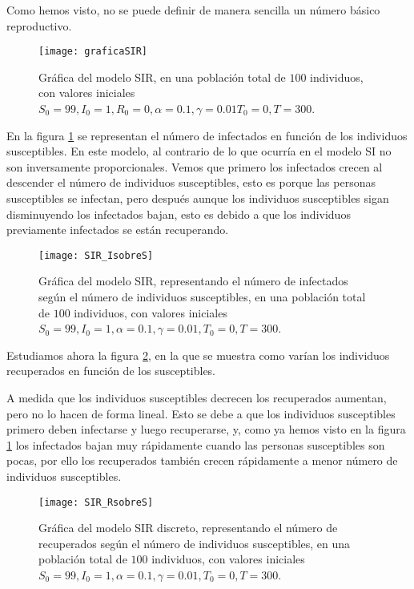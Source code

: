 Como hemos visto, no se puede definir de manera sencilla un número básico reproductivo.

\begin{figure}
\begin{center}
\caption{Gráfica del modelo SIR, en una población total de $100$ individuos, con valores iniciales $S_0=99, I_0 = 1, R_0 = 0, \alpha = 0.1, \gamma = 0.01 T_0 = 0, T = 300$.}
\texttt{[image: graficaSIR]}
\end{center}
\end{figure}

En la figura \ref{fig: SIR_IsobreS} se representan el número de infectados en función de los individuos susceptibles. En este modelo, al contrario de lo que ocurría en el modelo SI no son inversamente proporcionales. Vemos que primero los infectados crecen al descender el número de individuos susceptibles, esto es porque las personas susceptibles se infectan, pero después aunque los individuos susceptibles sigan disminuyendo los infectados bajan, esto es debido a que los individuos previamente infectados se están recuperando.

\begin{figure}
\begin{center}
\caption{Gráfica del modelo SIR, representando el número de infectados según el número de individuos susceptibles, en una población total de $100$ individuos, con valores iniciales $S_0=99, I_0 = 1, \alpha = 0.1, \gamma=0.01, T_0 = 0, T = 300$.}
\label{fig: SIR_IsobreS}
\texttt{[image: SIR\_IsobreS]}
\end{center}
\end{figure}

Estudiamos ahora la figura \ref{fig: SIR_RsobreS}, en la que se muestra como varían los individuos recuperados en función de los susceptibles.

A medida que los individuos susceptibles decrecen los recuperados aumentan, pero no lo hacen de forma lineal. Esto se debe a que los individuos susceptibles primero deben infectarse y luego recuperarse, y, como ya hemos visto en la figura \ref{fig: SIR_IsobreS} los infectados bajan muy rápidamente cuando las personas susceptibles son pocas, por ello los recuperados también crecen rápidamente a menor número de individuos susceptibles.

\begin{figure}
\begin{center}
\caption{Gráfica del modelo SIR discreto, representando el número de recuperados según el número de individuos susceptibles, en una población total de $100$ individuos, con valores iniciales $S_0=99, I_0 = 1, \alpha = 0.1, \gamma=0.01, T_0 = 0, T = 300$.}
\label{fig: SIR_RsobreS}
\texttt{[image: SIR\_RsobreS]}
\end{center}
\end{figure}

